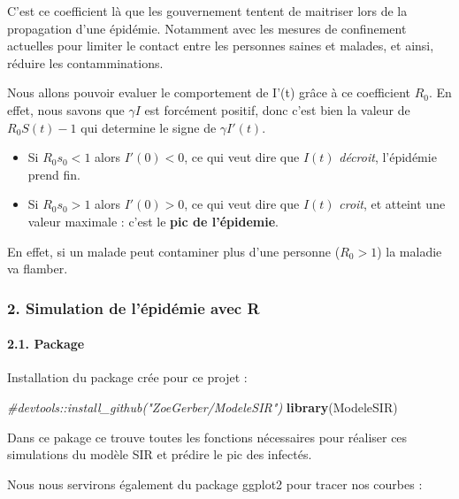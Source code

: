 \documentclass[
]{article}
\newenvironment{Shaded}{\begin{snugshade}}{\end{snugshade}}
\newcommand{\CommentTok}[1]{\textcolor[rgb]{0.56,0.35,0.01}{\textit{#1}}}
\newcommand{\KeywordTok}[1]{\textcolor[rgb]{0.13,0.29,0.53}{\textbf{#1}}}
\newcommand{\NormalTok}[1]{#1}
\providecommand{\tightlist}{%
  \setlength{\itemsep}{0pt}\setlength{\parskip}{0pt}}
\begin{document}
C'est ce coefficient là que les gouvernement tentent de maitriser lors
de la propagation d'une épidémie. Notamment avec les mesures de
confinement actuelles pour limiter le contact entre les personnes saines
et malades, et ainsi, réduire les contamminations.

Nous allons pouvoir evaluer le comportement de I'(t) grâce à ce
coefficient \(R_0\). En effet, nous savons que \(\gamma I\) est
forcément positif, donc c'est bien la valeur de \(R_0 S(t) - 1\) qui
determine le signe de \(\gamma I'(t)\).

\begin{itemize}
\tightlist
\item
  Si \(R_0 s_0 < 1\) alors \(I'(0) < 0\), ce qui veut dire que \(I(t)\)
  \emph{décroit}, l'épidémie prend fin.
\item
  Si \(R_0 s_0 > 1\) alors \(I'(0) > 0\), ce qui veut dire que \(I(t)\)
  \emph{croit}, et atteint une valeur maximale : c'est le \textbf{pic de
  l'épidemie}.
\end{itemize}

En effet, si un malade peut contaminer plus d'une personne (\(R_0 >1\))
la maladie va flamber.

\hypertarget{simulation-de-luxe9piduxe9mie-avec-r}{%
\subsubsection{2. Simulation de l'épidémie avec
R}\label{simulation-de-luxe9piduxe9mie-avec-r}}

\hypertarget{package}{%
\paragraph{2.1. Package}\label{package}}

Installation du package crée pour ce projet :

\begin{Shaded}
\begin{Highlighting}[]
\CommentTok{#devtools::install_github("ZoeGerber/ModeleSIR")}
\KeywordTok{library}\NormalTok{(ModeleSIR)}
\end{Highlighting}
\end{Shaded}

Dans ce pakage ce trouve toutes les fonctions nécessaires pour réaliser
ces simulations du modèle SIR et prédire le pic des infectés.

Nous nous servirons également du package ggplot2 pour tracer nos courbes
:
\end{document}
